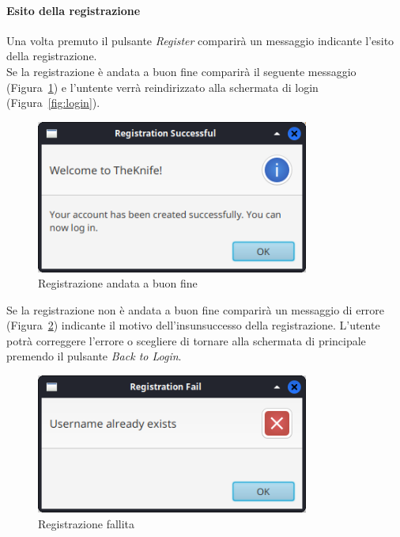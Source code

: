 \paragraph{Esito della registrazione}
Una volta premuto il pulsante \emph{Register} comparirà un
messaggio indicante l'esito della registrazione.\\
Se la registrazione è andata a buon fine comparirà il seguente 
messaggio (Figura~\ref{fig:registration-ok}) e l'untente verrà reindirizzato alla schermata di 
login (Figura~\ref{fig:login}).
\begin{figure}[H]
    \centering
    \includegraphics[width=0.8\textwidth]{images/r-ok.png}
    \caption{Registrazione andata a buon fine}
    \label{fig:registration-ok}
\end{figure}
Se la registrazione non è andata a buon fine comparirà 
un messaggio di errore (Figura~\ref{fig:registration-ko}) 
indicante il motivo dell'insunsuccesso della registrazione.
L'utente potrà correggere l'errore o scegliere di tornare alla
schermata di principale premendo il pulsante \emph{Back to Login}.
\begin{figure}[H]
    \centering
    \includegraphics[width=0.8\textwidth]{images/r-ko.png}
    \caption{Registrazione fallita}
    \label{fig:registration-ko}
\end{figure}

